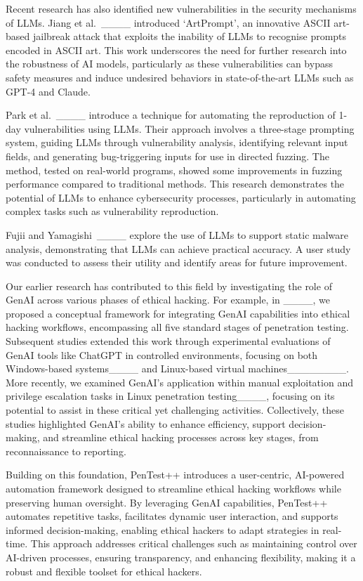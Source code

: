 Recent research has also identified new vulnerabilities in the security  mechanisms of  LLMs. Jiang et al.\ ____ introduced `ArtPrompt', an innovative ASCII
art-based jailbreak attack that exploits the inability of LLMs to recognise prompts encoded in
ASCII art. This work underscores the need for further research into the robustness of AI models,
particularly as these vulnerabilities can bypass safety measures and induce undesired behaviors in
state-of-the-art LLMs such as GPT-4 and Claude.

Park et al.\ ____ introduce a technique for automating the reproduction of 1-day vulnerabilities using LLMs. Their approach involves a three-stage prompting system, guiding LLMs through vulnerability analysis, identifying relevant input fields, and generating bug-triggering inputs for use in directed fuzzing. The method, tested on real-world programs, showed some improvements in fuzzing performance compared to traditional methods. This research demonstrates the potential of LLMs to enhance cybersecurity processes, particularly in automating complex tasks such as vulnerability reproduction.


Fujii and Yamagishi\ ____ explore the use of LLMs  to support static malware analysis, demonstrating that LLMs can achieve practical accuracy. A user study was conducted to assess their utility and identify areas for future improvement.


Our earlier research has  contributed to this field by investigating the role of GenAI across various phases of ethical hacking. For example, in ____, we proposed a conceptual framework for integrating GenAI capabilities into ethical hacking workflows, encompassing all five standard stages of penetration testing. Subsequent studies extended this work through experimental evaluations of GenAI tools like ChatGPT in controlled environments, focusing on both Windows-based systems____ and Linux-based virtual machines________.  More recently, we examined GenAI's application within manual exploitation and privilege escalation tasks in Linux penetration testing____, focusing on its potential to assist in these critical yet challenging activities. Collectively, these studies highlighted GenAI's ability to enhance efficiency, support decision-making, and streamline ethical hacking processes across key stages, from reconnaissance to reporting.

Building on this foundation, PenTest++ introduces a user-centric, AI-powered automation framework designed to streamline ethical hacking workflows while preserving human oversight. By leveraging GenAI capabilities, PenTest++ automates repetitive tasks, facilitates dynamic user interaction, and supports informed decision-making, enabling ethical hackers to adapt strategies in real-time. This approach addresses critical challenges such as maintaining control over AI-driven processes, ensuring transparency, and enhancing flexibility, making it a robust and flexible toolset for ethical hackers. 

